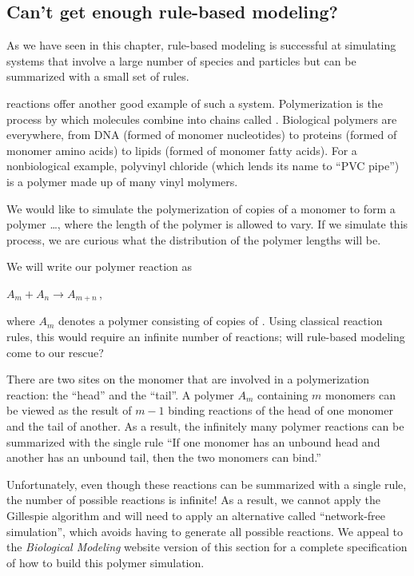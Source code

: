 \subsection{Can't get enough rule-based modeling?}

As we have seen in this chapter, rule-based modeling is successful at simulating systems that involve a large number of species and particles but can be summarized with a small set of rules.

 reactions offer another good example of such a system. Polymerization is the process by which  molecules combine into chains called . Biological polymers are everywhere, from DNA (formed of monomer nucleotides) to proteins (formed of monomer amino acids) to lipids (formed of monomer fatty acids). For a nonbiological example, polyvinyl chloride (which lends its name to ``PVC pipe'') is a polymer made up of many vinyl molymers.

We would like to simulate the polymerization of copies of a monomer  to form a polymer \ldots, where the length of the polymer is allowed to vary. If we simulate this process, we are curious what the distribution of the polymer lengths will be.

We will write our polymer reaction as

\begin{center}
$A_m + A_n \rightarrow A_{m+n}$\,,
\end{center}

\noindent where $A_m$ denotes a polymer consisting of  copies of . Using classical reaction rules, this would require an infinite number of reactions; will rule-based modeling come to our rescue?

There are two sites on the monomer  that are involved in a polymerization reaction: the ``head'' and the ``tail''. A polymer $A_m$ containing $m$ monomers can be viewed as the result of $m-1$ binding reactions of the head of one monomer and the tail of another. As a result, the infinitely many polymer reactions can be summarized with the single rule ``If one monomer has an unbound head and another has an unbound tail, then the two monomers can bind.''

Unfortunately, even though these reactions can be summarized with a single rule, the number of possible reactions is infinite! As a result, we cannot apply the Gillespie algorithm and will need to apply an alternative called ``network-free simulation'', which avoids having to generate all possible reactions. We appeal to the \textit{Biological Modeling} website version of this section for a complete specification of how to build this polymer simulation.\\

